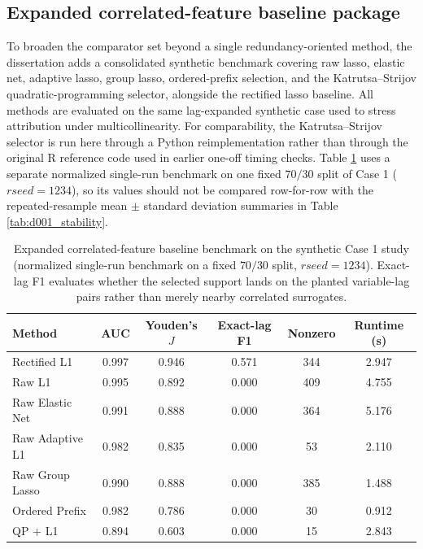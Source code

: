 \subsection{Expanded correlated-feature baseline package}

To broaden the comparator set beyond a single redundancy-oriented method, the dissertation adds a consolidated synthetic benchmark covering raw lasso, elastic net, adaptive lasso, group lasso, ordered-prefix selection, and the Katrutsa--Strijov quadratic-programming selector, alongside the rectified lasso baseline. All methods are evaluated on the same lag-expanded synthetic case used to stress attribution under multicollinearity. For comparability, the Katrutsa--Strijov selector is run here through a Python reimplementation rather than through the original R reference code used in earlier one-off timing checks. Table \ref{tab:d002_baselines} uses a separate normalized single-run benchmark on one fixed $70/30$ split of Case 1 ($rseed=1234$), so its values should not be compared row-for-row with the repeated-resample mean $\pm$ standard deviation summaries in Table \ref{tab:d001_stability}.

\begin{table}[tbh]
    \caption[RQ1 expanded synthetic baseline benchmark.]{Expanded correlated-feature baseline benchmark on the synthetic Case 1 study (normalized single-run benchmark on a fixed $70/30$ split, $rseed=1234$). Exact-lag F1 evaluates whether the selected support lands on the planted variable-lag pairs rather than merely nearby correlated surrogates.}
    \label{tab:d002_baselines}
    \begin{center}
        \begin{tabular}{lccccc}
            Method            & AUC   & Youden's $J$ & Exact-lag F1 & Nonzero & Runtime (s) \\ \hline
            Rectified L1      & 0.997 & 0.946        & 0.571        & 344     & 2.947       \\ \hline
            Raw L1            & 0.995 & 0.892        & 0.000        & 409     & 4.755       \\ \hline
            Raw Elastic Net   & 0.991 & 0.888        & 0.000        & 364     & 5.176       \\ \hline
            Raw Adaptive L1   & 0.982 & 0.835        & 0.000        & 53      & 2.110       \\ \hline
            Raw Group Lasso   & 0.990 & 0.888        & 0.000        & 385     & 1.488       \\ \hline
            Ordered Prefix    & 0.982 & 0.786        & 0.000        & 30      & 0.912       \\ \hline
            QP + L1           & 0.894 & 0.603        & 0.000        & 15      & 2.843       \\ \hline
        \end{tabular}
    \end{center}
\end{table}

